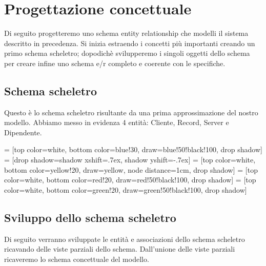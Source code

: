 \documentclass[11pt,a4paper] {article}
\begin{document}
\newpage
\section{Progettazione concettuale}
Di seguito progetteremo uno schema entity relationship che modelli il sistema descritto in precedenza. Si inizia estraendo i concetti più importanti creando un primo schema scheletro; dopodichè svilupperemo i singoli oggetti dello schema per creare infine uno schema e/r completo e coerente con le specifiche.

\subsection{Schema scheletro}
Questo è lo schema scheletro risultante da una prima approssimazione del nostro modello. Abbiamo messo in evidenza 4 entit\`a: Cliente, Record, Server e Dipendente.

\usetikzlibrary{positioning}
\usetikzlibrary{shadows}

 = [top color=white, bottom color=blue!30, draw=blue!50!black!100, drop shadow]
 = [drop shadow={shadow xshift=.7ex, shadow yshift=-.7ex}]
 = [top color=white, bottom color=yellow!20, draw=yellow, node distance=1cm, drop shadow]
 = [top color=white, bottom color=red!20, draw=red!50!black!100, drop shadow]
 = [top color=white, bottom color=green!20, draw=green!50!black!100, drop shadow]

\begin{figure}[!h]
\centering
{}
\end{figure}

\subsection{Sviluppo dello schema scheletro}
Di seguito verranno sviluppate le entità e associazioni dello schema scheletro ricavando delle viste parziali dello schema. Dall'unione delle viste parziali ricaveremo lo schema concettuale del modello.
\end{document}
